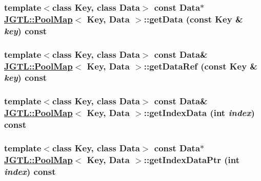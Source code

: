 \hypertarget{class_j_g_t_l_1_1_pool_map_7b04eb59001beed06626bde7622a42d0}{
\subsubsection[getData]{\setlength{\rightskip}{0pt plus 5cm}template$<$class Key, class Data$>$ const Data$\ast$ \hyperlink{class_j_g_t_l_1_1_pool_map}{JGTL::Pool\-Map}$<$ Key, Data $>$::get\-Data (const Key \& {\em key}) const}}
\label{class_j_g_t_l_1_1_pool_map_7b04eb59001beed06626bde7622a42d0}


\hypertarget{class_j_g_t_l_1_1_pool_map_27a40fef553c59284fc28621fd7515b5}{
\subsubsection[getDataRef]{\setlength{\rightskip}{0pt plus 5cm}template$<$class Key, class Data$>$ const Data\& \hyperlink{class_j_g_t_l_1_1_pool_map}{JGTL::Pool\-Map}$<$ Key, Data $>$::get\-Data\-Ref (const Key \& {\em key}) const}}
\label{class_j_g_t_l_1_1_pool_map_27a40fef553c59284fc28621fd7515b5}


\hypertarget{class_j_g_t_l_1_1_pool_map_9f6083416f0d4896c13003adb5c9b935}{
\subsubsection[getIndexData]{\setlength{\rightskip}{0pt plus 5cm}template$<$class Key, class Data$>$ const Data\& \hyperlink{class_j_g_t_l_1_1_pool_map}{JGTL::Pool\-Map}$<$ Key, Data $>$::get\-Index\-Data (int {\em index}) const}}
\label{class_j_g_t_l_1_1_pool_map_9f6083416f0d4896c13003adb5c9b935}


\hypertarget{class_j_g_t_l_1_1_pool_map_68006d0d7c9195990a8d24dab585ce01}{
\subsubsection[getIndexDataPtr]{\setlength{\rightskip}{0pt plus 5cm}template$<$class Key, class Data$>$ const Data$\ast$ \hyperlink{class_j_g_t_l_1_1_pool_map}{JGTL::Pool\-Map}$<$ Key, Data $>$::get\-Index\-Data\-Ptr (int {\em index}) const}}
\label{class_j_g_t_l_1_1_pool_map_68006d0d7c9195990a8d24dab585ce01}




